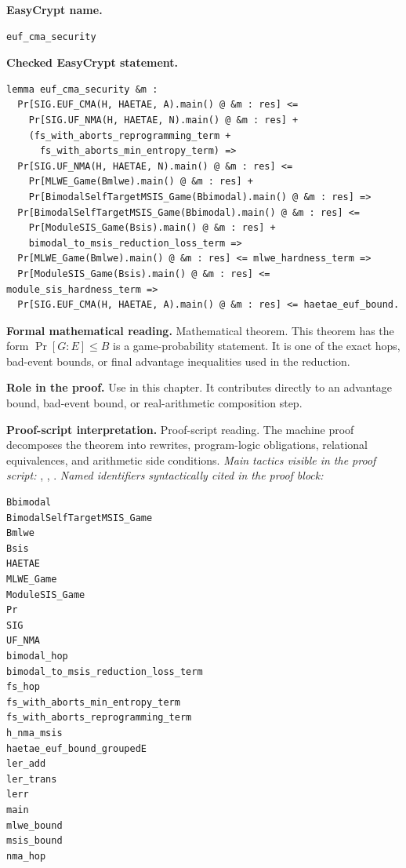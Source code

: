 \begin{formaltheorem}
\noindent\textbf{EasyCrypt name.}
\begin{lstlisting}[language=EasyCrypt,basicstyle=\ttfamily\scriptsize]
euf_cma_security
\end{lstlisting}
\noindent\textbf{Checked EasyCrypt statement.}
\begin{lstlisting}[language=EasyCrypt,basicstyle=\ttfamily\scriptsize]
lemma euf_cma_security &m :
  Pr[SIG.EUF_CMA(H, HAETAE, A).main() @ &m : res] <=
    Pr[SIG.UF_NMA(H, HAETAE, N).main() @ &m : res] +
    (fs_with_aborts_reprogramming_term +
      fs_with_aborts_min_entropy_term) =>
  Pr[SIG.UF_NMA(H, HAETAE, N).main() @ &m : res] <=
    Pr[MLWE_Game(Bmlwe).main() @ &m : res] +
    Pr[BimodalSelfTargetMSIS_Game(Bbimodal).main() @ &m : res] =>
  Pr[BimodalSelfTargetMSIS_Game(Bbimodal).main() @ &m : res] <=
    Pr[ModuleSIS_Game(Bsis).main() @ &m : res] +
    bimodal_to_msis_reduction_loss_term =>
  Pr[MLWE_Game(Bmlwe).main() @ &m : res] <= mlwe_hardness_term =>
  Pr[ModuleSIS_Game(Bsis).main() @ &m : res] <= module_sis_hardness_term =>
  Pr[SIG.EUF_CMA(H, HAETAE, A).main() @ &m : res] <= haetae_euf_bound.
\end{lstlisting}
\noindent\textbf{Formal mathematical reading.}
Mathematical theorem. This theorem has the form \(\Pr[G:E] \le B\) is a game-probability statement.  It is one of the exact hops, bad-event bounds, or final advantage inequalities used in the reduction.

\noindent\textbf{Role in the proof.}
Use in this chapter. It contributes directly to an advantage bound, bad-event bound, or real-arithmetic composition step.

\noindent\textbf{Proof-script interpretation.}
Proof-script reading. The machine proof decomposes the theorem into rewrites, program-logic obligations, relational equivalences, and arithmetic side conditions.
\emph{Main tactics visible in the proof script:} , , .
\emph{Named identifiers syntactically cited in the proof block:}
\begin{lstlisting}[language=EasyCrypt,basicstyle=\ttfamily\scriptsize]
Bbimodal
BimodalSelfTargetMSIS_Game
Bmlwe
Bsis
HAETAE
MLWE_Game
ModuleSIS_Game
Pr
SIG
UF_NMA
bimodal_hop
bimodal_to_msis_reduction_loss_term
fs_hop
fs_with_aborts_min_entropy_term
fs_with_aborts_reprogramming_term
h_nma_msis
haetae_euf_bound_groupedE
ler_add
ler_trans
lerr
main
mlwe_bound
msis_bound
nma_hop
\end{lstlisting}

\end{formaltheorem}

